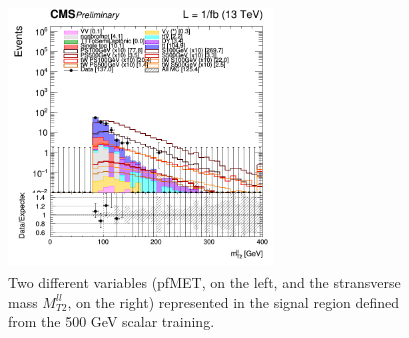 \documentclass[a4paper, 10pt, openright]{report}
\begin{document}
\begin{figure}[htbp]
{\begin{minipage}[b]{.48\textwidth}
\end{minipage}\hfill
\begin{minipage}[b]{.48\textwidth}
\includegraphics[width=7cm, height=7cm]{figs/2017/log_cratio_topCR_ll_DNN_signal0_scalar100_mt2ll.png}
\end{minipage} \hfill
}
\caption{Two different variables (pf\ac{MET}, on the left, and the stransverse mass $M_{T2}^{ll}$, on the right) represented in the signal region defined from the 500 GeV scalar training.}
\label{fig:SR2}
\end{figure}
\end{document}
